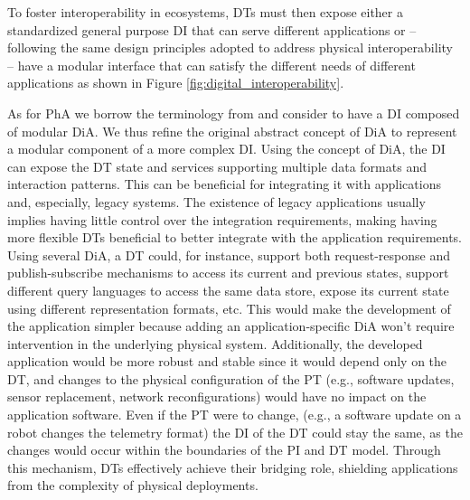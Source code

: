 To foster interoperability in ecosystems, \acp{DT} must then expose either a standardized general purpose \acf{DI} that can serve different applications or
-- following the same design principles adopted to address physical interoperability --
have a modular interface that can satisfy the different needs of different applications
as shown in Figure \ref{fig:digital_interoperability}.

As for \ac{PhA} we borrow the terminology from \cite{web-of-dt-ricci-2022} and consider to have a \ac{DI} composed of modular \ac{DiA}.
We thus refine the original abstract concept of \ac{DiA} to represent a modular component of a more complex \ac{DI}.
Using the concept of \ac{DiA}, the \ac{DI} can expose the \ac{DT} state and services supporting multiple data formats and interaction patterns.
This can be beneficial for integrating it with applications and, especially, legacy systems.
The existence of legacy applications usually implies having little control over the integration requirements, making having more flexible \acp{DT} beneficial to better integrate with the application requirements.
%
Using several \ac{DiA}, a \ac{DT} could, for instance, support both request-response and publish-subscribe mechanisms to access its current and previous states, support different query languages to access the same data store, expose its current state using different representation formats, etc.
%
This would make the development of the application simpler because adding an application-specific \ac{DiA} won't require intervention in the underlying physical system. 
%
Additionally, the developed application would be more robust and stable since it would depend only on the \ac{DT}, and changes to the physical configuration of the \ac{PT} (e.g., software updates, sensor replacement, network reconfigurations) would have no impact on the application software.
%
Even if the \ac{PT} were to change, (e.g., a software update on a robot changes the telemetry format) the \ac{DI} of the \ac{DT} could stay the same, as the changes would occur within the boundaries of the \ac{PI} and \ac{DT} model.
%
Through this mechanism, \acp{DT} effectively achieve their bridging role, shielding applications from the complexity of physical deployments.

